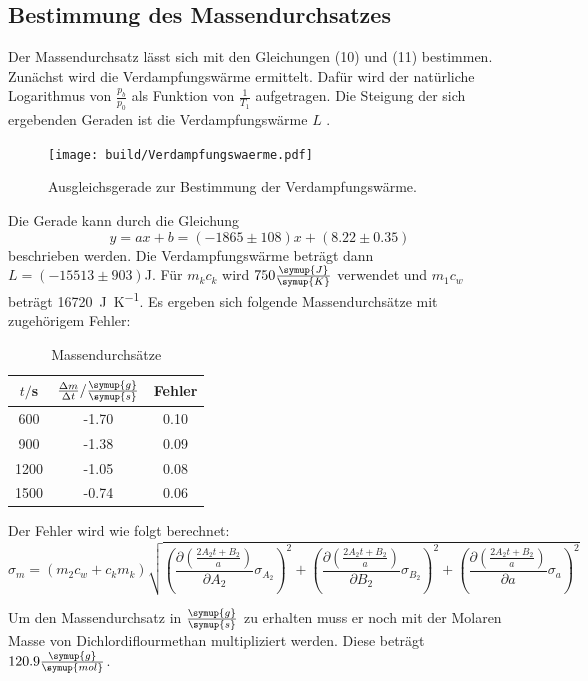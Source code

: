 \subsection{Bestimmung des Massendurchsatzes}
Der Massendurchsatz lässt sich mit den Gleichungen (10) und (11) bestimmen. Zunächst
wird die Verdampfungswärme ermittelt. Dafür wird der natürliche Logarithmus von
$\frac{p_b}{p_0}$ als Funktion von $\frac{1}{T_1}$ aufgetragen. Die Steigung der sich ergebenden
Geraden ist die Verdampfungswärme $L$ \cite{sample2}.
\begin{figure}[H]
  \centering
  \texttt{[image: build/Verdampfungswaerme.pdf]}
  \caption{Ausgleichsgerade zur Bestimmung der Verdampfungswärme.}
  \label{fig:Verdampfungswaerme}
\end{figure}
Die Gerade kann durch die Gleichung
\begin{equation}
  y = ax + b = (-1865 \pm 108)x + (8.22 \pm 0.35)
\end{equation}
beschrieben werden.
Die Verdampfungswärme beträgt dann $L = (-15513 \pm 903)$J.
Für $m_kc_k$ wird $750 \frac{\symup{J}}{\symup{K}}$ verwendet und $m_1c_w$ beträgt \SI{16720}{\joule\per\kelvin}.
Es ergeben sich folgende Massendurchsätze mit zugehörigem Fehler:
\begin{table}[H]
  \centering
  \caption{Massendurchsätze}
  \label{tab:Massendurchsätze}
  \begin{tabular}{c c c}
    \toprule
    $t/$s &$\frac{\Delta m}{\Delta t}/\frac{\symup{g}}{\symup{s}}$ & Fehler \\
    \midrule
      600 & -1.70 & 0.10 \\
      900 & -1.38 & 0.09 \\
     1200 & -1.05 & 0.08 \\
     1500 & -0.74 & 0.06 \\
    \bottomrule
  \end{tabular}
\end{table}

Der Fehler wird wie folgt berechnet:
\begin{equation}
  \sigma_m = (m_2c_w + c_km_k)\sqrt{
      \left( \frac{\partial \left(\frac{2A_2t + B_2}{a}\right)}{\partial A_2} \sigma_{A_2} \right)^{\!\! 2} +
      \left( \frac{\partial \left(\frac{2A_2t + B_2}{a}\right)}{\partial B_2} \sigma_{B_2} \right)^{\!\! 2} +
      \left( \frac{\partial \left(\frac{2A_2t + B_2}{a}\right)}{\partial a} \sigma_{a} \right)^{\!\! 2}
    }
\end{equation}

Um den Massendurchsatz in $\frac{\symup{g}}{\symup{s}}$ zu erhalten muss er noch
mit der Molaren Masse von Dichlordiflourmethan multipliziert werden.
Diese beträgt $120.9\frac{\symup{g}}{\symup{mol}}$.
